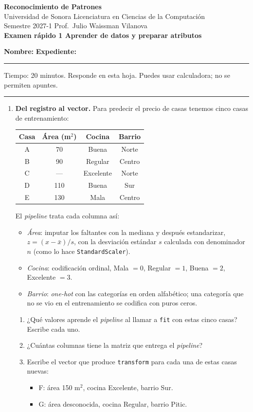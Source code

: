 \documentclass[11pt]{article}
\newcommand{\encabezado}[2]{%
\begin{center}
{\large\bfseries Reconocimiento de Patrones}\\[2pt]
Universidad de Sonora \textperiodcentered{} Licenciatura en Ciencias de la Computación\\
Semestre 2027-1 \textperiodcentered{} Prof.\ Julio Waissman Vilanova\\[10pt]
{\Large\bfseries #1}%
\ifdefined\tipodoc\\[4pt]{\large\itshape\tipodoc}\fi
\end{center}
\ifdefined\tipodoc\else
\vspace{6pt}
\textbf{Nombre:} \hrulefill\quad \textbf{Expediente:} \rule{3.5cm}{0.4pt}\par
\vspace{6pt}
\fi
#2
\par\medskip\hrule\medskip
}
\newcommand{\espacio}[1]{\par\vspace{#1}}
\begin{document}
\encabezado{Examen rápido 1 \textperiodcentered{} Aprender de datos y preparar atributos}{%
Tiempo: 20 minutos. Responde en esta hoja. Puedes usar calculadora; no se permiten apuntes.}

\begin{enumerate}

\item \textbf{Del registro al vector.} Para predecir el precio de casas tenemos cinco casas de entrenamiento:

\begin{center}
\begin{tabular}{cccc}
\toprule
Casa & Área (m$^2$) & Cocina & Barrio \\
\midrule
A & 70 & Buena & Norte \\
B & 90 & Regular & Centro \\
C & --- & Excelente & Norte \\
D & 110 & Buena & Sur \\
E & 130 & Mala & Centro \\
\bottomrule
\end{tabular}
\end{center}

El \emph{pipeline} trata cada columna así:
\begin{itemize}[itemsep=0pt]
  \item \emph{Área}: imputar los faltantes con la mediana y después estandarizar, $z = (x - \bar x)/s$, con la desviación estándar $s$ calculada con denominador $n$ (como lo hace \texttt{StandardScaler}).
  \item \emph{Cocina}: codificación ordinal, Mala $=0$, Regular $=1$, Buena $=2$, Excelente $=3$.
  \item \emph{Barrio}: \emph{one-hot} con las categorías en orden alfabético; una categoría que no se vio en el entrenamiento se codifica con puros ceros.
\end{itemize}

\begin{enumerate}
  \item ¿Qué valores aprende el \emph{pipeline} al llamar a \texttt{fit} con estas cinco casas? Escribe cada uno.
  \espacio{2.8cm}

  \item ¿Cuántas columnas tiene la matriz que entrega el \emph{pipeline}?
  \espacio{0.8cm}

  \item Escribe el vector que produce \texttt{transform} para cada una de estas casas nuevas:
  \begin{itemize}[itemsep=0pt]
    \item F: área 150 m$^2$, cocina Excelente, barrio Sur.
    \item G: área desconocida, cocina Regular, barrio Pitic.
  \end{itemize}
  \espacio{2.5cm}


\end{enumerate}
\end{enumerate}
\end{document}
